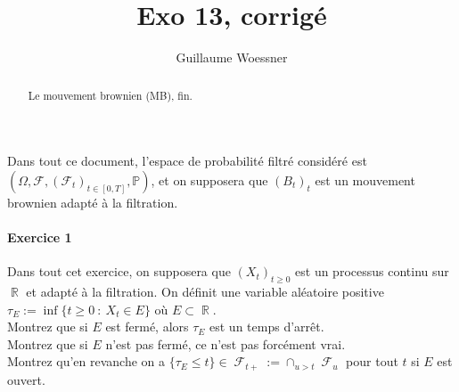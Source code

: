 \documentclass{article}
\title{Exo 13, corrigé}
\author{Guillaume Woessner}
\date{}                       %
\theoremstyle{definition}
\numberwithin{equation}{section}
\DeclareMathOperator{\R}{\mathbb{R}}
\DeclareMathOperator{\Ff}{\mathcal{F}}
\begin{document}
\maketitle                    %

\begin{abstract}
\begin{center}
Le mouvement brownien (MB), fin.
\end{center}
\end{abstract}



Dans tout ce document, l'espace de probabilité filtré considéré est $(\Omega,\mathcal{F},(\mathcal{F}_t)_{t\in[0,T]},\mathbb{P})$, et on supposera que $(B_t)_t$ est un mouvement brownien adapté à la filtration.\\




\paragraph{Exercice 1}
Dans tout cet exercice, on supposera que $(X_t)_{t\geq 0}$ est un processus continu sur $\R$ et adapté à la filtration. On définit une variable aléatoire positive $\tau_E:=\inf\{t\geq 0 ~:~X_t \in E\}$ où $E\subset \R$.\\
Montrez que si $E$ est fermé, alors $\tau_E$ est un temps d'arrêt.\\
Montrez que si $E$ n'est pas fermé, ce n'est pas forcément vrai.\\
Montrez qu'en revanche on a $\{\tau_E\leq t\}\in\Ff_{t+}:=\cap_{u>t}\Ff_u$ pour tout $t$ si $E$ est ouvert.
\end{document}
